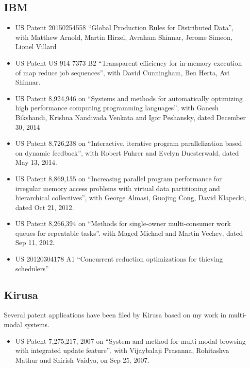 \documentclass{article}
\begin{document}
\subsection*{IBM}
\begin{itemize}

\item US Patent 20150254558 ``Global Production Rules for Distributed
  Data'', with Matthew Arnold, Martin Hirzel, Avraham Shinnar, Jerome Simeon,
Lionel Villard
\item US Patent US 914 7373 B2 ``Transparent efficiency for in-memory
  execution of map reduce job sequences'', with David Cunningham, Ben
  Herta, Avi Shinnar.

\item US Patent 8,924,946 on ``Systems and methods for automatically optimizing high performance computing programming languages'', with Ganesh Bikshandi, Krishna Nandivada Venkata and Igor Peshansky, dated December 30, 2014

\item US Patent 8,726,238 on ``Interactive, iterative program parallelization based on dynamic feedback'', with Robert Fuhrer and Evelyn Duesterwald, dated May 13, 2014.

\item US Patent 8,869,155 on ``Increasing parallel program performance for irregular memory access problems with virtual data partitioning and hierarchical collectives'', with George Almasi, Guojing Cong, David Klapecki, dated Oct 21, 2012.

\item US Patent 8,266,394 on ``Methods for single-owner multi-consumer work queues for repeatable tasks''. with Maged Michael and Martin Vechev, dated Sep 11, 2012.

\item US 20120304178 A1 ``Concurrent reduction optimizations for thieving schedulers''
\end{itemize}

\subsection*{Kirusa}
Several patent applications have been filed by Kirusa based on my work 
in multi-modal systems.

\begin{itemize}
\item US Patent 7,275,217, 2007 on ``System and method for multi-modal browsing with integrated update feature'', with Vijaybalaji Prasanna, Rohitashva Mathur and Shirish Vaidya, on Sep 25, 2007.
\end{itemize}
\end{document}
